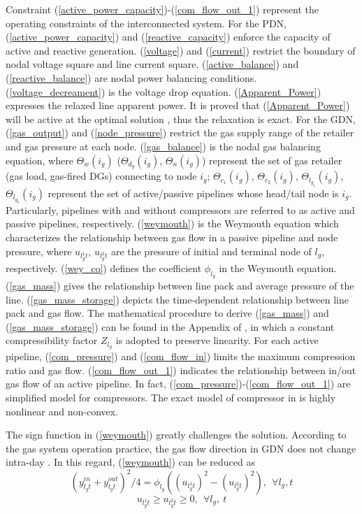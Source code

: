 \documentclass[journal]{IEEEtran}
\begin{document}
\vspace{6pt}
\noindent Constraint (\ref{active_power_capacity})-(\ref{com_flow_out_1}) represent the operating constraints of the interconnected system. For the PDN, (\ref{active_power_capacity}) and (\ref{reactive_capacity}) enforce the capacity of active and reactive generation. (\ref{voltage}) and (\ref{current}) restrict the boundary of nodal voltage square and line current square. (\ref{active_balance}) and (\ref{reactive_balance}) are nodal power balancing conditions. (\ref{voltage_decreament}) is the voltage drop equation. (\ref{Apparent_Power}) expresses the relaxed line apparent power. It is proved that (\ref{Apparent_Power}) will be active at the optimal solution  \cite{Low_PDN_SOCP}, thus the relaxation is exact. For the GDN, (\ref{gas_output}) and (\ref{node_pressure}) restrict the gas supply range of the retailer and gas pressure at each node. (\ref{gas_balance}) is the nodal gas balancing equation, where $\Theta_w(i_g)$ ($\Theta_{d_g}(i_g)$, $\Theta_{n}(i_g)$) represent the set of gas retailer (gas load, gas-fired DGs) connecting to node $i_g$; $\Theta_{c_{1}}(i_g)$, $\Theta_{c_{2}}(i_g)$, $\Theta_{l_{g_{1}}}(i_g)$, $\Theta_{l_{g_{2}}}(i_g)$ represent the set of active/passive pipelines whose head/tail node is $i_g$. Particularly, pipelines with and without compressors are referred to as active and passive pipelines, respectively. (\ref{weymouth}) is the Weymouth equation which characterizes the relationship between gas flow in a passive pipeline and node pressure, where $u_{l_g^1t}$, $u_{l_g^2t}$ are the pressure of initial and terminal node of $l_g$, respectively. (\ref{wey_co}) defines the coefficient $\phi_{l_g}$ in the Weymouth equation. (\ref{gas_mass}) gives the relationship between line pack and average pressure of the line. (\ref{gas_mass_storage}) depicts the time-dependent relationship between line pack and gas flow. The mathematical procedure to derive (\ref{gas_mass}) and (\ref{gas_mass_storage}) can be found in the Appendix of \cite{CorreaPosada2015}, in which a constant compressibility factor $Z_{l_g}$ is adopted to preserve linearity. For each active pipeline, (\ref{com_pressure}) and (\ref{com_flow_in}) limits the maximum compression ratio and gas flow. (\ref{com_flow_out_1}) indicates the relationship between in/out gas flow of an active pipeline. In fact, (\ref{com_pressure})-(\ref{com_flow_out_1}) are simplified model for compressors. The exact model of compressor in \cite{Cong_Dispatch} is highly nonlinear and non-convex.

The sign function in (\ref{weymouth}) greatly challenges the solution. According to the gas system operation practice, the gas flow direction in GDN does not change intra-day \cite{Nico_SingleDirection}. In this regard, (\ref{weymouth}) can be reduced as
\begin{equation}\label{weymouth_easy}
(y_{l_gt}^{in}+y_{l_gt}^{out})^2/4 = \phi_{l_g}((u_{l_g^1t})^2-(u_{l_g^2t})^2),~~\forall l_g,t
\end{equation}
\begin{equation}\label{weymouth_easy_positive}
u_{l_g^1t} \ge u_{l_g^2t} \ge 0, ~~\forall l_g,~t
\end{equation}
\end{document}
